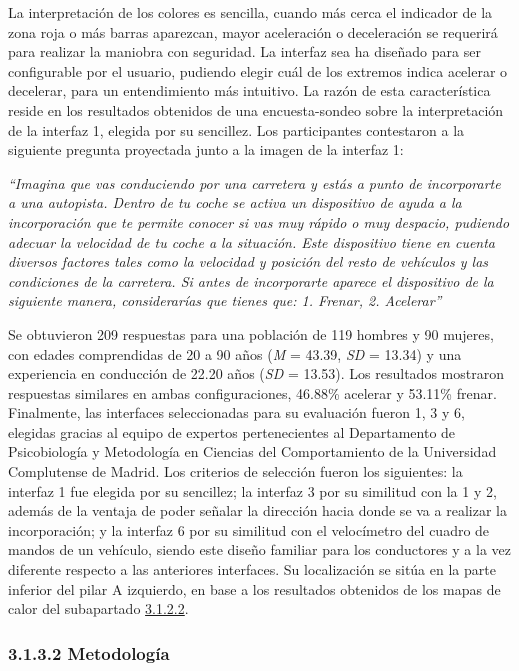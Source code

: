 La interpretación de los colores es sencilla, cuando más cerca el indicador de la zona roja o más barras aparezcan, mayor aceleración o deceleración se requerirá para realizar la maniobra con seguridad. La interfaz sea ha diseñado para ser configurable por el usuario, pudiendo elegir cuál de los extremos indica acelerar o decelerar, para un entendimiento más intuitivo. La razón de esta característica reside en los resultados obtenidos de una encuesta-sondeo sobre la interpretación de la interfaz 1, elegida por su sencillez. Los participantes contestaron a la siguiente pregunta proyectada junto a la imagen de la interfaz 1:

\emph{``Imagina que vas conduciendo por una carretera y estás a punto de incorporarte a una autopista. Dentro de tu coche se activa un dispositivo de ayuda a la incorporación que te permite conocer si vas muy rápido o muy despacio, pudiendo adecuar la velocidad de tu coche a la situación. Este dispositivo tiene en cuenta diversos factores tales como la velocidad y posición del resto de vehículos y las condiciones de la carretera. Si antes de incorporarte aparece el dispositivo de la siguiente manera, considerarías que tienes que: 1. Frenar, 2. Acelerar''}

Se obtuvieron 209 respuestas para una población de 119 hombres y 90 mujeres, con edades comprendidas de 20 a 90 años (\emph{M} = 43.39, \emph{SD} = 13.34) y una experiencia en conducción de 22.20 años (\emph{SD} = 13.53). Los resultados mostraron respuestas similares en ambas configuraciones, 46.88\% acelerar y 53.11\% frenar.
Finalmente, las interfaces seleccionadas para su evaluación fueron 1, 3 y 6, elegidas gracias al equipo de expertos pertenecientes al Departamento de  Psicobiología y Metodología en Ciencias del Comportamiento de la Universidad Complutense de Madrid. Los criterios de selección fueron los siguientes: la interfaz 1 fue elegida por su sencillez; la interfaz 3 por su similitud con la 1 y 2, además de la ventaja de poder señalar la dirección hacia donde se va a realizar la incorporación; y la interfaz 6 por su similitud con el velocímetro del cuadro de mandos de un vehículo, siendo este diseño familiar para los conductores y a la vez diferente respecto a las anteriores interfaces. 
Su localización se sitúa en la parte inferior del pilar A izquierdo, en base a los resultados obtenidos de los mapas de calor del subapartado \hyperref[3122]{3.1.2.2}.

\subsubsection{3.1.3.2	Metodología}\label{3132}

